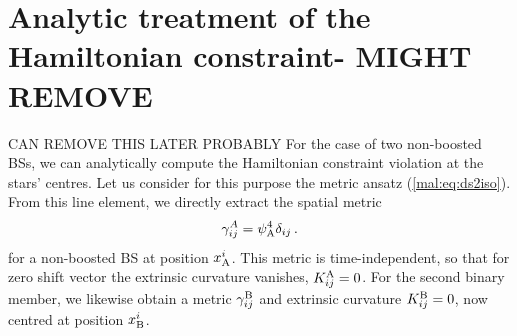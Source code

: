 
\section{Analytic treatment of the Hamiltonian constraint- MIGHT REMOVE}
\label{mal:sec:hamanalytic}
CAN REMOVE THIS LATER PROBABLY 
For the case of two non-boosted BSs, we can analytically
compute the Hamiltonian constraint violation
at the stars' centres. Let us consider for this purpose
the metric ansatz (\ref{mal:eq:ds2iso}). From this line
element, we directly extract the spatial metric
%
%
\begin{equation}
    \gamma_{ij}^{A} = \psi_{\rm A}^4 \delta_{ij}\,.\label{mal:eqn:appendixansatzmetric}
\end{equation}
%
for a non-boosted BS at position $x_{\rm A}^i$.
This metric is time-independent,
so that for zero shift vector the extrinsic curvature vanishes,
%
$K_{ij}^{\rm A} = 0$. 
%
For the second binary member, we likewise obtain a
metric $\gamma^{\rm B}_{ij}$ and extrinsic curvature
$K^{\rm B}_{ij}=0$, now centred at position $x_{\rm B}^i$.

